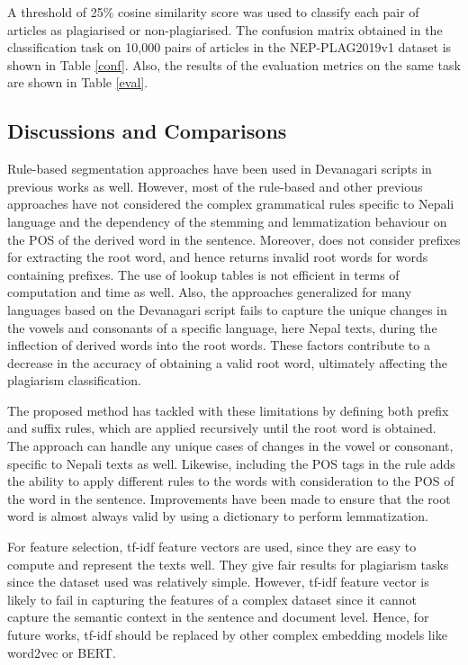 \documentclass[conference]{IEEEtran}
\begin{document}
A threshold of 25\% cosine similarity score was used to classify 
each pair of articles as plagiarised or
non-plagiarised. The confusion matrix obtained in the classification task on
10,000 pairs of articles in the NEP-PLAG2019v1 dataset is shown in 
Table \ref{conf}. Also, the results of the evaluation metrics on the same 
task are shown in Table \ref{eval}.

\subsection{Discussions and Comparisons}
Rule-based segmentation approaches have been used in Devanagari scripts in previous works
\cite{abhishek_effective_2013} as well. However, most of the rule-based and
other previous approaches \cite{dangui_lightweight_2015, pande_devanagari_nodate}
have not considered the complex grammatical rules specific to Nepali language
and the dependency of the stemming and lemmatization behaviour on the POS of the
derived word in the sentence. Moreover, \cite{dangui_lightweight_2015} does not
consider prefixes for extracting the root word, and hence returns invalid root
words for words containing prefixes. The use of lookup tables is not efficient
in terms of computation and time as well. Also, the approaches generalized for many
languages based on the Devanagari script 
\cite{dangui_lightweight_2015, pande_devanagari_nodate} fails to capture the
unique changes in the vowels and consonants of a specific language, here Nepal
texts, during the inflection of derived words into the root words. These factors
contribute to a decrease in the accuracy of obtaining a valid root word,
ultimately affecting the plagiarism classification. 

The proposed method has tackled with these limitations by defining both prefix
and suffix rules, which are applied recursively until the root word is obtained.
The approach can 
handle any unique cases of changes in the vowel or consonant, specific to
Nepali texts as well. Likewise,
including the POS tags in the rule adds the ability to apply different rules to
the words with consideration to the POS of the word in the sentence.
Improvements have been made to ensure that the root word is almost always valid
by using a dictionary to perform lemmatization.

For feature selection, tf-idf feature vectors are used, since they are easy to
compute and represent the texts well. They give fair results for plagiarism
tasks since the dataset used was relatively simple. However, tf-idf feature
vector is likely to fail in capturing the features of a complex dataset since it
cannot capture the semantic context in the sentence and document level. Hence,
for future works, tf-idf should be replaced by other complex embedding models like
word2vec or BERT.
\end{document}
